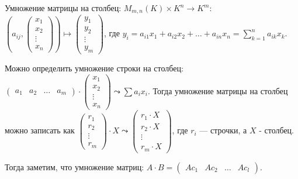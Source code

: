 \begin{definition}
    Умножение матрицы на столбец: $M_{m, n}(K) \times K^n \to K^m$: $(a_{ij}, \begin{pmatrix} x_1 \\ x_2 \\ \vdots \\ x_n \end{pmatrix}) \mapsto \begin{pmatrix} y_1 \\ y_2 \\ \vdots \\ y_m \end{pmatrix}$, где $y_i = a_{i 1} x_1 + a_{i 2}x_2 + \ldots + a_{in}x_n = \sum\limits_{k=1}^n a_{ik}x_k$.

    Можно определить умножение строки на столбец:  $\begin{pmatrix} a_1 & a_2 & \ldots & a_m \end{pmatrix} \cdot \begin{pmatrix} x_1 \\ x_2 \\ \vdots \\ x_n\end{pmatrix} \leadsto \sum a_i x_i$.  Тогда умножение матрицы на столбец можно записать как $\begin{pmatrix} r_1 \\ r_2 \\ \vdots \\ r_m \end{pmatrix} \cdot X \leadsto \begin{pmatrix} r_1 \cdot X \\ r_2 \cdot X \\ \vdots \\ r_m \cdot X \end{pmatrix}$, где $r_i$ --- строчки, а $X$ - столбец.

     Тогда заметим, что умножение матриц: $A \cdot B = \begin{pmatrix} Ac_1 & Ac_2 & \ldots  & Ac_l \end{pmatrix}$.
\end{definition}
